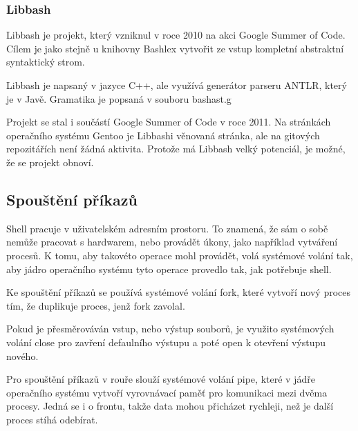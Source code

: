 \documentclass[thesis=M,czech]{FITthesis}[2012/06/26]
\begin{document}

%
%
%
\subsubsection{Libbash}

Libbash je projekt, který vzniknul v roce 2010 na akci Google Summer of Code. Cílem je jako stejně u knihovny Bashlex vytvořit ze vstup kompletní abstraktní syntaktický strom.

Libbash je napsaný v jazyce C++, ale využívá generátor parseru ANTLR, který je v Javě. Gramatika je popsaná v souboru bashast.g

Projekt se stal i součástí Google Summer of Code v roce 2011. Na stránkách operačního systému Gentoo je Libbashi věnovaná stránka, ale na gitových repozitářích není žádná aktivita. Protože má Libbash velký potenciál, je možné, že se projekt obnoví.





%
%
%
\subsection{Spouštění příkazů}\label{sec:exec}

Shell pracuje v uživatelském adresním prostoru. To znamená, že sám o sobě nemůže pracovat s hardwarem, nebo provádět úkony, jako například vytváření procesů. K tomu, aby takovéto operace mohl provádět, volá systémové volání tak, aby jádro operačního systému tyto operace provedlo tak, jak potřebuje shell.

Ke spouštění příkazů se používá systémové volání fork, které vytvoří nový proces tím, že duplikuje proces, jenž fork zavolal.

Pokud je přesměrováván vstup, nebo výstup souborů, je využito systémových volání close pro zavření defaulního výstupu a poté open k otevření výstupu nového.

Pro spouštění příkazů v rouře slouží systémové volání pipe, které v jádře operačního systému vytvoří vyrovnávací paměť pro komunikaci mezi dvěma procesy. Jedná se i o frontu, takže data mohou přicházet rychleji, než je další proces stíhá odebírat.
\end{document}
